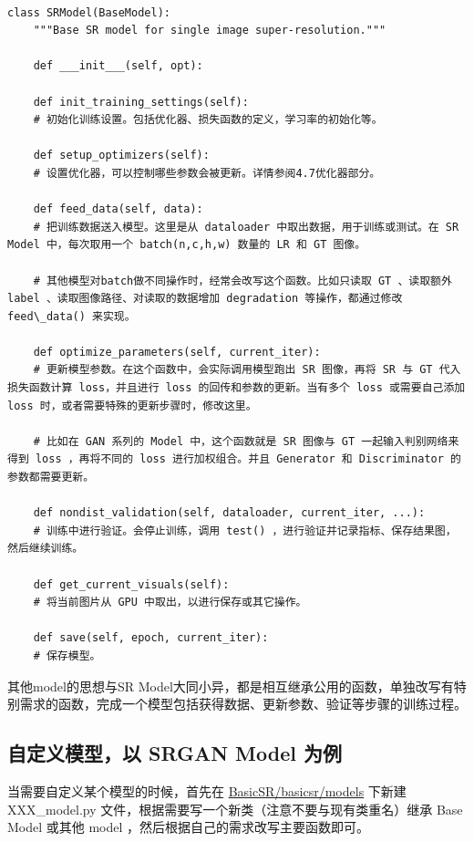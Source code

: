 \documentclass[../main.tex]{subfiles}
\begin{document}
\begin{verbatim}

class SRModel(BaseModel):
    """Base SR model for single image super-resolution."""

    def ___init___(self, opt):

    def init_training_settings(self):
    # 初始化训练设置。包括优化器、损失函数的定义，学习率的初始化等。

    def setup_optimizers(self):
    # 设置优化器，可以控制哪些参数会被更新。详情参阅4.7优化器部分。

    def feed_data(self, data):
    # 把训练数据送入模型。这里是从 dataloader 中取出数据，用于训练或测试。在 SR Model 中，每次取用一个 batch(n,c,h,w) 数量的 LR 和 GT 图像。

    # 其他模型对batch做不同操作时，经常会改写这个函数。比如只读取 GT 、读取额外 label 、读取图像路径、对读取的数据增加 degradation 等操作，都通过修改 feed\_data() 来实现。

    def optimize_parameters(self, current_iter):
    # 更新模型参数。在这个函数中，会实际调用模型跑出 SR 图像，再将 SR 与 GT 代入损失函数计算 loss，并且进行 loss 的回传和参数的更新。当有多个 loss 或需要自己添加 loss 时，或者需要特殊的更新步骤时，修改这里。

    # 比如在 GAN 系列的 Model 中，这个函数就是 SR 图像与 GT 一起输入判别网络来得到 loss ，再将不同的 loss 进行加权组合。并且 Generator 和 Discriminator 的参数都需要更新。

    def nondist_validation(self, dataloader, current_iter, ...):
    # 训练中进行验证。会停止训练，调用 test() ，进行验证并记录指标、保存结果图，然后继续训练。

    def get_current_visuals(self):
    # 将当前图片从 GPU 中取出，以进行保存或其它操作。

    def save(self, epoch, current_iter):
    # 保存模型。
\end{verbatim}

其他model的思想与SR Model大同小异，都是相互继承公用的函数，单独改写有特别需求的函数，完成一个模型包括获得数据、更新参数、验证等步骤的训练过程。


\subsection{自定义模型，以 SRGAN Model 为例}

当需要自定义某个模型的时候，首先在 \href{https://github.com/XPixelGroup/BasicSR/blob/master/basicsr/models}{BasicSR/basicsr/models} 下新建 XXX\_model.py 文件，根据需要写一个新类（注意不要与现有类重名）继承 Base Model 或其他 model ，然后根据自己的需求改写主要函数即可。
\end{document}
